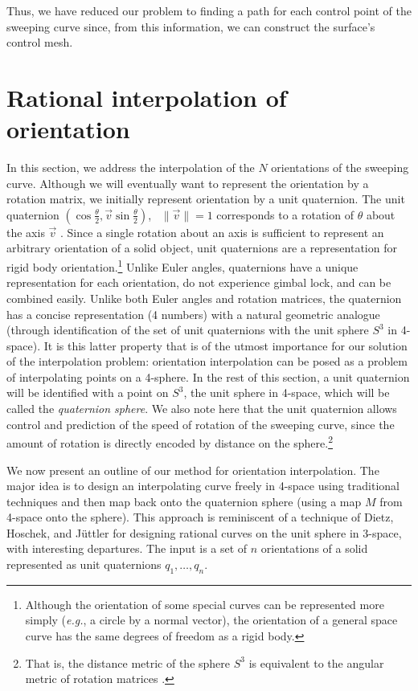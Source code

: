 Thus, we have reduced our problem to finding a path for each control point of
the sweeping curve since, from this information, 
we can construct the surface's control mesh.

\section{Rational interpolation of orientation}
\label{sec:orient-express}

In this section, we address the interpolation of the $N$ orientations
of the sweeping curve.
Although we will eventually want to represent the orientation 
by a rotation matrix, we initially 
represent orientation by a unit quaternion.
The unit quaternion
$(\cos \frac{\theta}{2}, \vec{v} \sin \frac{\theta}{2})$, \ $\|\vec{v}\| = 1$
corresponds to a rotation of $\theta$ about the axis $\vec{v}$ 
\cite{hoschek+lasser93}.
Since a single rotation about an axis is sufficient
to represent an arbitrary orientation of a solid object,
unit quaternions are a representation for rigid body 
orientation.\footnote{Although the orientation of some special curves
     can be represented more simply ({\em e.g.}, a circle by a normal 
     vector), the orientation of a general space curve has the same degrees
     of freedom as a rigid body.}
Unlike Euler angles, quaternions have a unique representation 
for each orientation, do not experience gimbal lock, and can be
combined easily.
Unlike both Euler angles and rotation matrices,
the quaternion has a concise representation (4 numbers) with a natural
geometric analogue (through identification of the set of unit quaternions 
with the unit sphere $S^3$ in 4-space).
It is this latter property that is of the utmost importance for 
our solution of the
interpolation problem: orientation interpolation can be posed as
a problem of interpolating points on a 4-sphere.
In the rest of this section, a unit quaternion will be identified
with a point on $S^3$, the unit sphere in 4-space, which will be
called the {\em quaternion sphere}.
We also note here that the unit quaternion allows control and prediction
of the speed of rotation of the sweeping curve, since the amount of
rotation is directly encoded by distance on the sphere.\footnote{That is,
	the distance metric of the sphere $S^3$ is equivalent to the
	angular metric of rotation matrices \cite{misner73}.}

We now present an outline of our method for orientation interpolation.
The major idea is to design an interpolating curve freely in 4-space
using traditional techniques and then map back onto the quaternion sphere
(using a map $M$ from 4-space onto the sphere).
This approach is reminiscent of a technique of Dietz, Hoschek, and J\"{u}ttler 
\cite{Dietz93} for designing rational curves on the unit sphere in 3-space,
with interesting departures.
The input is a set of $n$ orientations of a solid
represented as unit quaternions $q_1,\ldots,q_n$.

